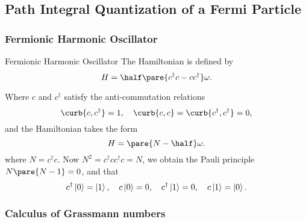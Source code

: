 \documentclass[hidelinks]{article}
\begin{document}



\subsection{Path Integral Quantization of a Fermi Particle} %
\label{sub:path_integral_quantization_of_a_fermi_particle}

\subsubsection{Fermionic Harmonic Oscillator} %
\label{ssub:fermionic_harmonic_oscillator}

\begin{termdef}{Fermionic Harmonic Oscillator}
    The Hamiltonian is defined by
    \[ H = \half\pare{c^\dagger c - cc^\dagger} \omega. \]
\end{termdef}
Where $c$ and $c^\dagger$ satisfy the anti-commutation relations
\[ \curb{c,c^\dagger} = 1,\quad \curb{c,c} = \curb{c^\dagger,c^\dagger} = 0, \]
and the Hamiltonian takes the form
\[ H = \pare{N-\half}\omega. \]
where $N = c^\dagger c$. Now $N^2 = c^\dagger c c^\dagger c = N$, we obtain the Pauli principle $N\pare{N-1} = 0$, and that
\[ c^\dagger\ket{0} = \ket{1},\quad c\ket{0} = 0,\quad c^\dagger\ket{1} = 0,\quad c\ket{1} = \ket{0}. \]


\subsubsection{Calculus of Grassmann numbers} %
\label{ssub:calculus_of_grassmann_numbers}
\end{document}
